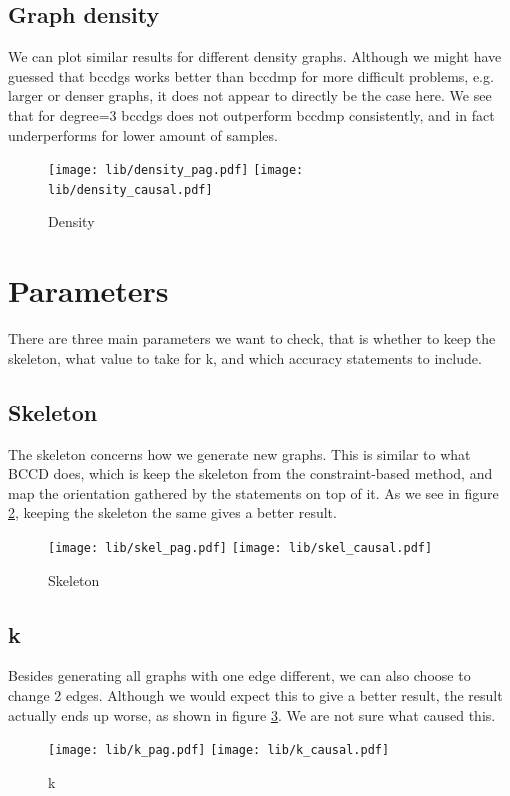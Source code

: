 \documentclass[11pt,a4paper]{report}
\theoremstyle{definition}
\begin{document}
\subsection{Graph density}
We can plot similar results for different density graphs. Although we
might have guessed that bccdgs works better than bccdmp for more difficult
problems, e.g. larger or denser graphs, it does not appear to directly be
the case here. We see that for degree=3 bccdgs does not outperform bccdmp
consistently, and in fact underperforms for lower amount of samples.
\begin{figure}
  \centering
  \texttt{[image: lib/density\_pag.pdf]}
  \texttt{[image: lib/density\_causal.pdf]}
  \caption{Density}
  \label{fig:density_causal}
\end{figure}

\section{Parameters}
There are three main parameters we want to check, that is whether to keep
the skeleton, what value to take for k, and which accuracy statements to
include.

\subsection{Skeleton}
The skeleton concerns how we generate new graphs. This is similar to what
BCCD does, which is keep the skeleton from the constraint-based method,
and map the orientation gathered by the statements on top of it. As we see
in figure \ref{fig:skel_causal}, keeping the skeleton the same gives a
better result.
\begin{figure}
  \centering
  \texttt{[image: lib/skel\_pag.pdf]}
  \texttt{[image: lib/skel\_causal.pdf]}
  \caption{Skeleton}
  \label{fig:skel_causal}
\end{figure}

\subsection{k}
Besides generating all graphs with one edge different, we can also choose
to change 2 edges. Although we would expect this to give a better result,
the result actually ends up worse, as shown in figure \ref{fig:k_causal}.
We are not sure what caused this.
\begin{figure}
  \centering
  \texttt{[image: lib/k\_pag.pdf]}
  \texttt{[image: lib/k\_causal.pdf]}
  \caption{k}
  \label{fig:k_causal}
\end{figure}
\end{document}
